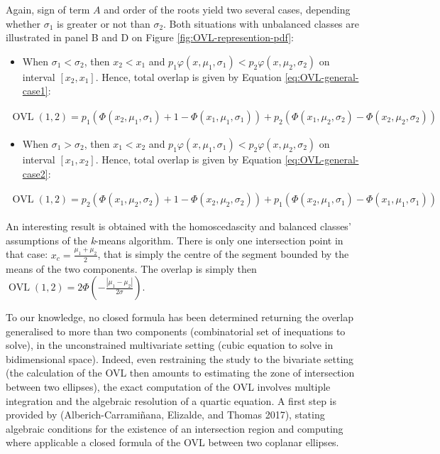Again, sign of term \(A\) and order of the roots yield two several cases,
depending whether \(\sigma_1\) is greater or not than \(\sigma_2\). Both
situations with unbalanced classes are illustrated in panel B and D on
Figure
\ref{fig:OVL-represention-pdf}:

\begin{itemize}
\tightlist
\item
  When \(\sigma_1 < \sigma_2\), then \(x_2 < x_1\) and
  \(p_1 \varphi(x, \mu_1, \sigma_1) < p_2 \varphi(x, \mu_2, \sigma_2)\)
  on interval \([x_2, x_1]\). Hence, total overlap is given by Equation
  \eqref{eq:OVL-general-case1}:
\end{itemize}

\begin{equation}
\begin{split}
\operatorname{OVL} (1, 2) = p_1 \left(\Phi(x_2, \mu_1, \sigma_1) +1 - \Phi(x_1, \mu_1, \sigma_1) \right) + p_2 \left( \Phi(x_1, \mu_2, \sigma_2) -\Phi(x_2, \mu_2, \sigma_2) \right)
\end{split}
\label{eq:OVL-general-case1}
\end{equation}

\begin{itemize}
\tightlist
\item
  When \(\sigma_1 > \sigma_2\), then \(x_1 < x_2\) and
  \(p_1 \varphi(x, \mu_1, \sigma_1) < p_2 \varphi(x, \mu_2, \sigma_2)\)
  on interval \([x_1, x_2]\). Hence, total overlap is given by Equation
  \eqref{eq:OVL-general-case2}:
\end{itemize}

\begin{equation}
\begin{split}
\operatorname{OVL} (1, 2) = p_2 \left(\Phi(x_1, \mu_2, \sigma_2) +1 - \Phi(x_2, \mu_2, \sigma_2) \right) + p_1 \left( \Phi(x_2, \mu_1, \sigma_1) -\Phi(x_1, \mu_1, \sigma_1) \right)
\end{split}
\label{eq:OVL-general-case2}
\end{equation}

An interesting result is obtained with the homoscedascity and balanced
classes' assumptions of the \emph{k}-means algorithm. There is only one
intersection point in that case: \(x_c= \frac{\mu_1 + \mu_2}{2}\), that is
simply the centre of the segment bounded by the means of the two
components. The overlap is simply then
\(\operatorname{OVL} (1, 2) = 2 \Phi (- \frac{|\mu_1 - \mu_2|}{2\sigma})\).

To our knowledge, no closed formula has been determined returning the overlap generalised to more than two components (combinatorial set of inequations to solve), in the unconstrained multivariate setting (cubic equation to solve in bidimensional space). Indeed, even restraining the study to the bivariate setting (the calculation of the OVL then amounts to estimating the zone of intersection between two ellipses), the exact computation of the OVL involves multiple integration and the algebraic resolution of a quartic equation. A first step is provided by (Alberich-Carramiñana, Elizalde, and Thomas 2017), stating algebraic conditions for the existence of an intersection region and computing where applicable a closed formula of the OVL between two coplanar ellipses.

